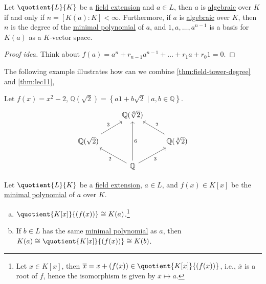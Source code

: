 \begin{theorem}\label{thm:lec11}
	Let \(\quotient{L}{K} \) be a \hyperref[def:field-extension]{field extension} and \(a\in L\), then \(a\) is \hyperref[def:algebraic]{algebraic} over \(K\) if and only if \(n = [K(a) \colon K] < \infty \). Furthermore, if \(a\) is \hyperref[def:algebraic]{algebraic} over \(K\), then \(n\) is the degree of the \hyperref[def:minimal-polynomial]{minimal polynomial} of \(a\), and \(1, a, \ldots , a^{n-1}\) is a basis for \(K(a)\) as a \(K\)-vector space.
\end{theorem}
\begin{proof}[Proof idea]
	Think about \(f(a) = a^n + r_{n-1} a^{n-1} + \ldots + r_1 a + r_0 1 = 0\).
\end{proof}

The following example illustrates how can we combine \autoref{thm:field-tower-degree} and \autoref{thm:lec11},

\begin{eg}
	Let \(f(x) = x^2 - 2\), \(\mathbb{Q} (\sqrt{2} ) = \left\{ a1+b\sqrt{2} \mid a, b\in \mathbb{Q} \right\} \).
	\[
		\begin{tikzcd}
			& {\mathbb{Q}(\sqrt[6]{2})} \\
			{\mathbb{Q}(\sqrt{2})} && {\mathbb{Q}(\sqrt[3]{2})} \\
			& {\mathbb{Q}}
			\arrow["3"', from=3-2, to=2-3]
			\arrow["2"', from=2-3, to=1-2]
			\arrow["6"', from=3-2, to=1-2]
			\arrow["2", from=3-2, to=2-1]
			\arrow["3", from=2-1, to=1-2]
		\end{tikzcd}
	\]
\end{eg}

\begin{theorem}\label{thm:field-isomorphism}
	Let \(\quotient{L}{K} \) be a \hyperref[def:field-extension]{field extension}, \(a\in L\), and \(f(x)\in K[x]\) be the \hyperref[def:minimal-polynomial]{minimal polynomial} of \(a\) over \(K\).
	\begin{enumerate}[(a)]
		\item \(\quotient{K[x]}{(f(x))} \cong K(a)\).\footnote{Let \(x\in K[x]\), then \(\overline{x} = x+(f(x))\in \quotient{K[x]}{(f(x))} \), i.e., \(\overline{x} \) is a root of \(f\), hence the isomorphism is given by \(\overline{x} \mapsto a\).}
		\item If \(b\in L\) has the same \hyperref[def:minimal-polynomial]{minimal polynomial} as \(a\), then \(K(a) \cong \quotient{K[x]}{(f(x))} \cong K(b)\).
	\end{enumerate}
\end{theorem}

